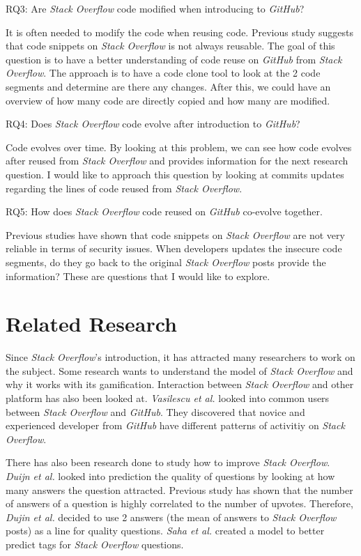\documentclass[sigconf]{acmart}
\begin{document}
RQ3: Are {\it Stack Overflow} code modified when introducing to {\it GitHub}?

It is often needed to modify the code when reusing code. Previous study suggests that code snippets on {\it Stack Overflow} is not always reusable. \cite{Yang:2016:QUC:2901739.2901767} The goal of this question is to have a better understanding of code reuse on {\it GitHub} from {\it Stack Overflow}. The approach is to have a code clone tool to look at the 2 code segments and determine are there any changes. After this, we could have an overview of how many code are directly copied and how many are modified.

RQ4: Does {\it Stack Overflow} code evolve after introduction to {\it GitHub}?

Code evolves over time. By looking at this problem, we can see how code evolves after reused from {\it Stack Overflow} and provides information for the next research question. I would like to approach this question by looking at commits updates regarding the lines of code reused from {\it Stack Overflow}.

RQ5: How does {\it Stack Overflow} code reused on {\it GitHub} co-evolve together.

Previous studies have shown that code snippets on {\it Stack Overflow} are not very reliable in terms of security issues. \cite{7958574} When developers updates the insecure code segments, do they go back to the original {\it Stack Overflow} posts provide the information? These are questions that I would like to explore.

\section{Related Research}

Since {\it Stack Overflow}'s introduction, it has attracted many researchers to work on the subject. Some research wants to understand the model of {\it Stack Overflow} \cite{Barua2014} and why it works with its gamification. \cite{Cavusoglu:2015:GMV:2685553.2698999} Interaction between {\it Stack Overflow} and other platform has also been looked at. {\it Vasilescu et al.} looked into common users between {\it Stack Overflow} and {\it GitHub}. They discovered that novice and experienced developer from {\it GitHub} have different patterns of activitiy on {\it Stack Overflow}. \cite{6693332}

There has also been research done to study how to improve {\it Stack Overflow}. {\it Duijn et al.} looked into prediction the quality of questions by looking at how many answers the question attracted. \cite{Duijn:2015:QQN:2820518.2820574} Previous study has shown that the number of answers of a question is highly correlated to the number of upvotes. Therefore, {\it Dujin et al.} decided to use 2 answers (the mean of answers to {\it Stack Overflow} posts) as a line for quality questions. {\it Saha et al.} created a model to better predict tags for {\it Stack Overflow} questions. \cite{Saha:2013:DMA:2487085.2487103} 
\end{document}
